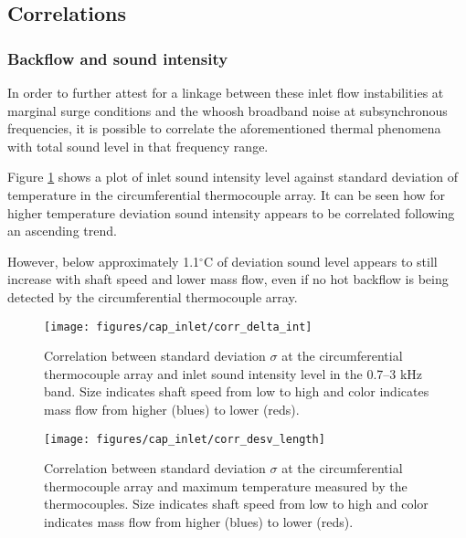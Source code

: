 \subsection{Correlations}

\subsubsection{Backflow and sound intensity}

In order to further attest for a linkage between these inlet flow instabilities at marginal surge conditions and the whoosh broadband noise at subsynchronous frequencies, it is possible to correlate the aforementioned thermal phenomena with total sound level in that frequency range.

Figure \ref{fig:corr1} shows a plot of inlet sound intensity level against standard deviation of temperature in the circumferential thermocouple array. It can be seen how for higher temperature deviation sound intensity appears to be correlated following an ascending trend. 

However, below approximately 1.1$^{\circ}$C of deviation sound level appears to still increase with shaft speed and lower mass flow, even if no hot backflow is being detected by the circumferential thermocouple array.

\begin{figure}[htb!]
\centering
\texttt{[image: figures/cap\_inlet/corr\_delta\_int]}
\caption{Correlation between standard deviation $\sigma$ at the circumferential thermocouple array and inlet sound intensity level in the 0.7--3 kHz band. Size indicates shaft speed from low to high and color indicates mass flow from higher (blues) to lower (reds).}
\label{fig:corr1}
\end{figure}

\begin{figure}[htb!]
\centering
\texttt{[image: figures/cap\_inlet/corr\_desv\_length]}
\caption{Correlation between standard deviation $\sigma$ at the circumferential thermocouple array and maximum temperature measured by the thermocouples. Size indicates shaft speed from low to high and color indicates mass flow from higher (blues) to lower (reds).}
\label{fig:corr2}
\end{figure}

